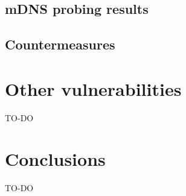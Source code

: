 \documentclass[fleqn, 11pt]{SelfArx} %
\begin{document}
\subsection{mDNS probing results}
\subsection{Countermeasures} %


\section{Other vulnerabilities}
TO-DO


\section{Conclusions}
TO-DO




\nocite{*}

\end{document}

